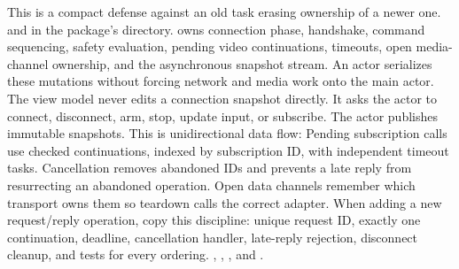 {}\markdownRendererInterblockSeparator
{}This is a compact defense against an old task erasing ownership of a newer one.\markdownRendererInterblockSeparator
{}
\markdownRendererSectionEnd \markdownRendererSectionBegin
{}\markdownRendererInterblockSeparator
{}\markdownRendererBlockQuoteBegin
{}  and  in the package's  directory.\markdownRendererBlockQuoteEnd \markdownRendererInterblockSeparator
{} owns connection phase, handshake, command sequencing, safety evaluation, pending video continuations, timeouts, open media-channel ownership, and the asynchronous snapshot stream. An actor serializes these mutations without forcing network and media work onto the main actor.\markdownRendererParagraphSeparator
{}The view model never edits a connection snapshot directly. It asks the actor to connect, disconnect, arm, stop, update input, or subscribe. The actor publishes immutable snapshots. This is unidirectional data flow:\markdownRendererInterblockSeparator
{}\markdownRendererInterblockSeparator
{}Pending subscription calls use checked continuations, indexed by subscription ID, with independent timeout tasks. Cancellation removes abandoned IDs and prevents a late reply from resurrecting an abandoned operation. Open data channels remember which transport owns them so teardown calls the correct adapter.\markdownRendererParagraphSeparator
{}When adding a new request/reply operation, copy this discipline: unique request ID, exactly one continuation, deadline, cancellation handler, late-reply rejection, disconnect cleanup, and tests for every ordering.\markdownRendererInterblockSeparator
{}
\markdownRendererSectionEnd \markdownRendererSectionBegin
{}\markdownRendererInterblockSeparator
{}\markdownRendererBlockQuoteBegin
{} , , , and .\markdownRendererBlockQuoteEnd \markdownRendererInterblockSeparator
